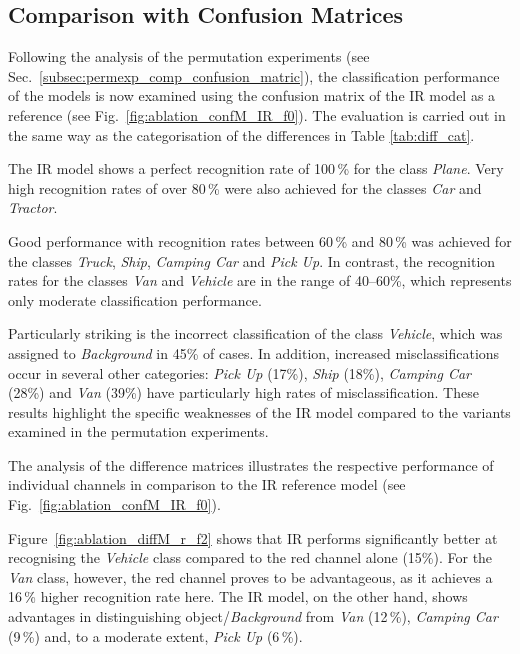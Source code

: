 \FloatBarrier
\subsection*{Comparison with Confusion Matrices}
\label{subsec:ablation_comp_confusion_matric}

Following the analysis of the permutation experiments (see Sec.~\ref{subsec:permexp_comp_confusion_matric}), the classification performance of the models is now examined using the confusion matrix of the IR model as a reference (see Fig.~\ref{fig:ablation_confM_IR_f0}). The evaluation is carried out in the same way as the categorisation of the differences in Table \ref{tab:diff_cat}.  

The IR model shows a perfect recognition rate of 100\,\% for the class \textit{Plane}. Very high recognition rates of over 80\,\% were also achieved for the classes \textit{Car} and \textit{Tractor}.

Good performance with recognition rates between 60\,\% and 80\,\% was achieved for the classes \textit{Truck}, \textit{Ship}, \textit{Camping Car} and \textit{Pick Up}. In contrast, the recognition rates for the classes \textit{Van} and \textit{Vehicle} are in the range of 40–60\%, which represents only moderate classification performance. 

Particularly striking is the incorrect classification of the class \textit{Vehicle}, which was assigned to \textit{Background} in 45\% of cases. In addition, increased misclassifications occur in several other categories: \textit{Pick Up} (17\%), \textit{Ship} (18\%), \textit{Camping Car} (28\%) and \textit{Van} (39\%) have particularly high rates of misclassification. These results highlight the specific weaknesses of the IR model compared to the variants examined in the permutation experiments.
  


The analysis of the difference matrices illustrates the respective performance of individual channels in comparison to the IR reference model (see Fig.~\ref{fig:ablation_confM_IR_f0}).

Figure~\ref{fig:ablation_diffM_r_f2} shows that IR performs significantly better at recognising the \textit{Vehicle} class compared to the red channel alone (15\%). For the \textit{Van} class, however, the red channel proves to be advantageous, as it achieves a 16\,\% higher recognition rate here. The IR model, on the other hand, shows advantages in distinguishing object/\textit{Background} from \textit{Van} (12\,\%), \textit{Camping Car} (9\,\%) and, to a moderate extent, \textit{Pick Up} (6\,\%).
    
